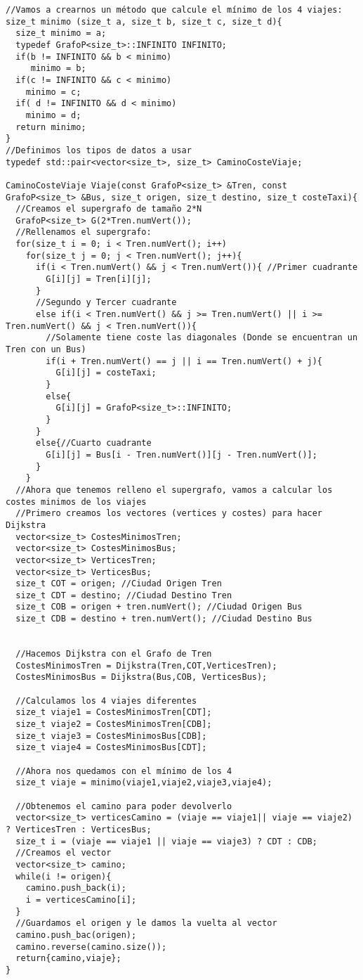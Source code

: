 \begin{verbatim}
//Vamos a crearnos un método que calcule el mínimo de los 4 viajes:
size_t minimo (size_t a, size_t b, size_t c, size_t d){
  size_t minimo = a;
  typedef GrafoP<size_t>::INFINITO INFINITO;
  if(b != INFINITO && b < minimo)
     minimo = b;
  if(c != INFINITO && c < minimo)
    minimo = c;
  if( d != INFINITO && d < minimo)
    minimo = d;
  return minimo;
}
//Definimos los tipos de datos a usar
typedef std::pair<vector<size_t>, size_t> CaminoCosteViaje;

CaminoCosteViaje Viaje(const GrafoP<size_t> &Tren, const GrafoP<size_t> &Bus, size_t origen, size_t destino, size_t costeTaxi){
  //Creamos el supergrafo de tamaño 2*N
  GrafoP<size_t> G(2*Tren.numVert());
  //Rellenamos el supergrafo:
  for(size_t i = 0; i < Tren.numVert(); i++)
    for(size_t j = 0; j < Tren.numVert(); j++){
      if(i < Tren.numVert() && j < Tren.numVert()){ //Primer cuadrante
        G[i][j] = Tren[i][j];
      }
      //Segundo y Tercer cuadrante
      else if(i < Tren.numVert() && j >= Tren.numVert() || i >= Tren.numVert() && j < Tren.numVert()){
        //Solamente tiene coste las diagonales (Donde se encuentran un Tren con un Bus)
        if(i + Tren.numVert() == j || i == Tren.numVert() + j){
          G[i][j] = costeTaxi;
        }
        else{
          G[i][j] = GrafoP<size_t>::INFINITO;
        }
      }
      else{//Cuarto cuadrante
        G[i][j] = Bus[i - Tren.numVert()][j - Tren.numVert()];
      }
    }
  //Ahora que tenemos relleno el supergrafo, vamos a calcular los costes minimos de los viajes
  //Primero creamos los vectores (vertices y costes) para hacer Dijkstra
  vector<size_t> CostesMinimosTren;
  vector<size_t> CostesMinimosBus;
  vector<size_t> VerticesTren;
  vector<size_t> VerticesBus;
  size_t COT = origen; //Ciudad Origen Tren
  size_t CDT = destino; //Ciudad Destino Tren
  size_t COB = origen + tren.numVert(); //Ciudad Origen Bus
  size_t CDB = destino + tren.numVert(); //Ciudad Destino Bus


  //Hacemos Dijkstra con el Grafo de Tren
  CostesMinimosTren = Dijkstra(Tren,COT,VerticesTren);
  CostesMinimosBus = Dijkstra(Bus,COB, VerticesBus);

  //Calculamos los 4 viajes diferentes
  size_t viaje1 = CostesMinimosTren[CDT];
  size_t viaje2 = CostesMinimosTren[CDB];
  size_t viaje3 = CostesMinimosBus[CDB];
  size_t viaje4 = CostesMinimosBus[CDT];

  //Ahora nos quedamos con el mínimo de los 4
  size_t viaje = minimo(viaje1,viaje2,viaje3,viaje4);

  //Obtenemos el camino para poder devolverlo
  vector<size_t> verticesCamino = (viaje == viaje1|| viaje == viaje2) ? VerticesTren : VerticesBus;
  size_t i = (viaje == viaje1 || viaje == viaje3) ? CDT : CDB;
  //Creamos el vector
  vector<size_t> camino;
  while(i != origen){
    camino.push_back(i);
    i = verticesCamino[i];
  }
  //Guardamos el origen y le damos la vuelta al vector
  camino.push_bac(origen);
  camino.reverse(camino.size());
  return{camino,viaje};
}
\end{verbatim}

